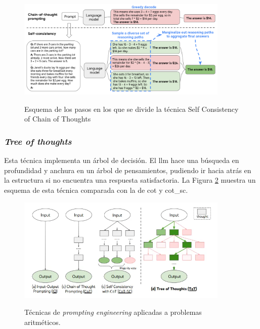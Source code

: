 \begin{figure}[H]
    \caption[]{Esquema de los pasos en los que se divide la técnica {Self Consistency of Chain of Thoughts}}
    \centering
    \includegraphics[width=0.9\textwidth]{./figuras/cot_sc.png}
    \label{fig:cot_sc}
\end{figure}

\subsubsection{\emph{Tree of thoughts}}

Esta técnica implementa un árbol de decisión. El \gls{llm} hace una búsqueda en profundidad y anchura en un árbol de pensamientos, pudiendo ir hacia atrás en la estructura si no encuentra una respuesta satisfactoria. La Figura \ref{fig:prompting_engineering} muestra un esquema de esta técnica comparada con la de \gls{cot} y \gls{cot_sc}.

\begin{figure}[H]
  \caption[Técnicas de \emph{prompting engineering}]{Técnicas de \emph{prompting engineering} aplicadas a problemas aritméticos.}
  \centering
  \includegraphics[width=0.9\textwidth]{./figuras/prompt_engineering_techniques.png}
  \label{fig:prompting_engineering}
\end{figure}


